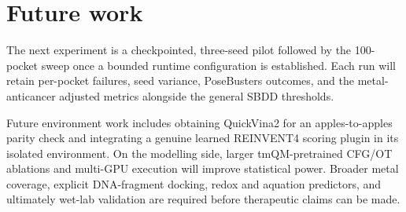 \section{Future work}
\label{sec:future}

The next experiment is a checkpointed, three-seed pilot followed by the
100-pocket sweep once a bounded runtime configuration is established.  Each
run will retain per-pocket failures, seed variance, PoseBusters outcomes, and
the metal-anticancer adjusted metrics alongside the general SBDD thresholds.

Future environment work includes obtaining QuickVina2 for an apples-to-apples
parity check and integrating a genuine learned REINVENT4 scoring plugin in its
isolated environment.  On the modelling side, larger tmQM-pretrained CFG/OT
ablations and multi-GPU execution will improve statistical power.  Broader
metal coverage, explicit DNA-fragment docking, redox and aquation predictors,
and ultimately wet-lab validation are required before therapeutic claims can
be made.
